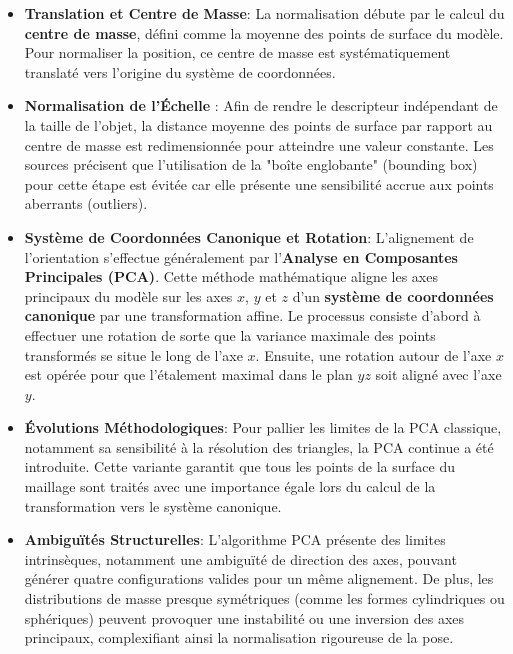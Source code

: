 \documentclass[11pt,a4paper,oneside]{report}
\begin{document}
\begin{itemize}
    \item \textbf{Translation et Centre de Masse}:  La normalisation débute par le calcul du \textbf{centre de masse}, défini comme la moyenne des points de surface du modèle. Pour normaliser la position, ce centre de masse est systématiquement translaté vers l'origine du système de coordonnées.

    \item \textbf{Normalisation de l'Échelle} : Afin de rendre le descripteur indépendant de la taille de l'objet, la distance moyenne des points de surface par rapport au centre de masse est redimensionnée pour atteindre une valeur constante. Les sources précisent que l'utilisation de la "boîte englobante" (bounding box) pour cette étape est évitée car elle présente une sensibilité accrue aux points aberrants (outliers).
    
    \item \textbf{Système de Coordonnées Canonique et Rotation}: L'alignement de l'orientation s'effectue généralement par l'\textbf{Analyse en Composantes Principales (PCA)}. Cette méthode mathématique aligne les axes principaux du modèle sur les axes $x$, $y$ et $z$ d'un \textbf{système de coordonnées canonique} par une transformation affine. Le processus consiste d'abord à effectuer une rotation de sorte que la variance maximale des points transformés se situe le long de l'axe $x$. Ensuite, une rotation autour de l'axe $x$ est opérée pour que l'étalement maximal dans le plan $yz$ soit aligné avec l'axe $y$.
    
    \item \textbf{Évolutions Méthodologiques}: Pour pallier les limites de la PCA classique, notamment sa sensibilité à la résolution des triangles, la PCA continue a été introduite. Cette variante garantit que tous les points de la surface du maillage sont traités avec une importance égale lors du calcul de la transformation vers le système canonique.
    
    \item \textbf{Ambiguïtés Structurelles}: L'algorithme PCA présente des limites intrinsèques, notamment une ambiguïté de direction des axes, pouvant générer quatre configurations valides pour un même alignement. De plus, les distributions de masse presque symétriques (comme les formes cylindriques ou sphériques) peuvent provoquer une instabilité ou une inversion des axes principaux, complexifiant ainsi la normalisation rigoureuse de la pose.
\end{itemize}
\end{document}
